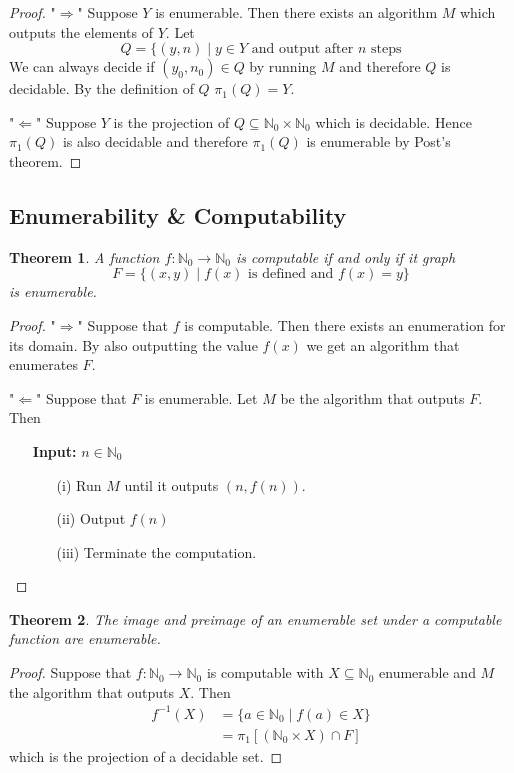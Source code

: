 \documentclass[10pt, letterpaper]{article}
\newcommand{\N}{\mathbb{N}}
\newtheorem{thm}{Theorem}
\theoremstyle{remark}
\theoremstyle{definition}
\begin{document}
\begin{proof}
	"$\Rightarrow$" Suppose $Y$ is enumerable. Then there exists an algorithm $M$ which outputs the elements of $Y$. Let
	\[
		Q = \{(y,n) \mid y \in Y \text{ and output after $n$ steps}
	\]
	We can always decide if $(y_0, n_0) \in Q$ by running $M$ and therefore $Q$ is decidable. By the definition of $Q$
	$\pi_1(Q) = Y$.

	"$\Leftarrow$" Suppose $Y$ is the projection of $Q \subseteq \N_0 \times \N_0$ which is decidable. Hence $\pi_1(Q)$ is also decidable
	and therefore $\pi_1(Q)$ is enumerable by Post's theorem.
\end{proof}

\subsection*{Enumerability \& Computability}

\begin{thm}
	A function $f: \N_0 \rightarrow \N_0$ is computable if and only if it graph 
	\[
		F = \{(x,y) \mid f(x) \text{ is defined and } f(x) = y \}
	\]
	is enumerable.
\end{thm}

\begin{proof}
	"$\Rightarrow$" Suppose that $f$ is computable. Then there exists an enumeration for its domain. By also outputting the value $f(x)$ we get
	an algorithm that enumerates $F$.

	"$\Leftarrow$" Suppose that $F$ is enumerable. Let $M$ be the algorithm that outputs $F$. Then 
	\begin{enumerate}
		\item[] \textbf{Input: } $n \in \N_0$
		\begin{enumerate}
			\item[(i)] Run $M$ until it outputs $(n, f(n))$.
			\item[(ii)] Output $f(n)$
			\item[(iii)] Terminate the computation.  
		\end{enumerate}
	\end{enumerate}
\end{proof}

\begin{thm}
	The image and preimage of an enumerable set under a computable function are enumerable.
\end{thm}

\begin{proof}
	Suppose that $f: \N_0 \rightarrow \N_0$ is computable with $X \subseteq \N_0$ enumerable and $M$ the algorithm that outputs $X$.
Then 
	\begin{align*}
		f^{-1}(X) &= \{a \in \N_0 \mid f(a) \in X\} \\
				  &= \pi_1[(\N_0 \times X) \cap F]
	\end{align*}
which is the projection of a decidable set.
\end{proof}
\end{document}
